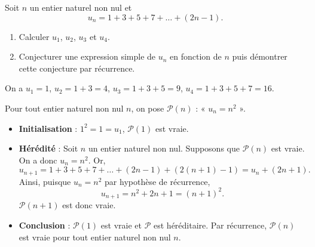 \documentclass[11pt,fleqn]{book} %
\begin{document}
\begin{exercise}[topic=rec01]
Soit \(n\) un entier naturel non nul et \[u_n=1+3+5+7+\dots + (2n-1).\]
\begin{enumerate}
 	\item Calculer \(u_1\), \(u_2\), \(u_3\) et \(u_4\).
 	\item Conjecturer une expression simple de \(u_n\) en fonction de \(n\) puis démontrer cette conjecture par récurrence.
\end{enumerate}\end{exercise}
\begin{solution}On a \(u_1=1\), \(u_2=1+3=4\), \(u_3=1+3+5=9\), \(u_4=1+3+5+7=16\).

Pour tout entier naturel non nul \(n\), on pose \(\mathcal{P}(n)\) : « \(u_n=n^2\) ».
\begin{itemize} \item \textbf{Initialisation} : \( 1^2=1=u_1\), \( \mathcal{P}(1) \) est vraie.
\item \textbf{Hérédité} : Soit \(n\) un entier naturel non nul. Supposons que \( \mathcal{P}(n)\) est vraie. On a donc \(u_n=n^2\). Or,
\[u_{n+1}= 1+3+5+7+\dots + (2n-1)+(2(n+1)-1)=u_n + (2n+1).\]
Ainsi, puisque \(u_n=n^2\) par hypothèse de récurrence,
\[u_{n+1}=n^2+2n+1=(n+1)^2.\]\( \mathcal{P}(n+1)\) est donc vraie.
\item \textbf{Conclusion} : \(\mathcal{P}(1)\) est vraie et \(\mathcal{P}\) est héréditaire. Par récurrence, \(\mathcal{P}(n)\) est vraie pour tout entier naturel non nul \(n\).\end{itemize}\end{solution}
\end{document}
